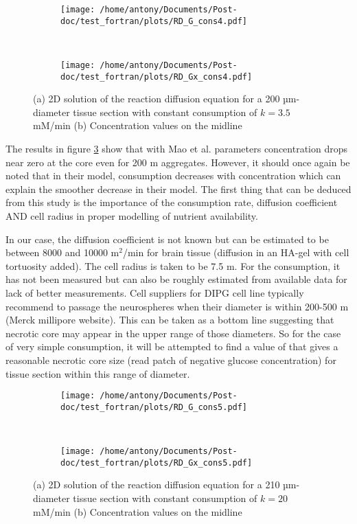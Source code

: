 \documentclass[11pt,a4paper]{article}
\begin{document}
\begin{figure}[ht!]
	\begin{subfigure}{0.45\textwidth}
	\centering
	\texttt{[image: /home/antony/Documents/Post-doc/test\_fortran/plots/RD\_G\_cons4.pdf]}
	\caption{ \label{RD_G_cons4}}
	\end{subfigure}
	~~
	\begin{subfigure}{0.45\textwidth}
	\texttt{[image: /home/antony/Documents/Post-doc/test\_fortran/plots/RD\_Gx\_cons4.pdf]}
		\caption{ \label{RD_Gx_cons4}}
	\end{subfigure}
	\caption{(a) 2D solution of the reaction diffusion equation for a 200 µm-diameter tissue section with constant consumption of $k = 3.5$ mM/min (b) Concentration values on the midline \label{RD_cons4}}
\end{figure}

The results in figure \ref{RD_cons4} show that with Mao et al. parameters concentration drops near zero at the core even for 200 \textmu m aggregates. However, it should once again be noted that in their model, consumption decreases  with concentration which can explain the smoother decrease in their model. The first thing that can be deduced from this study is the importance of the consumption rate, diffusion coefficient AND cell radius in proper modelling of nutrient availability.

In our case, the diffusion coefficient is not known but can be estimated to be between 8000 and 10000 \textmu m$^2$/min for brain tissue (diffusion in an HA-gel with cell tortuosity added).  The cell radius is taken to be 7.5 \textmu m. For the consumption, it has not been measured but can also be roughly estimated from available data for lack of better measurements. Cell suppliers for DIPG cell line typically recommend to passage the neurospheres when their diameter is within 200-500 \textmu m (Merck millipore website). This can be taken as a bottom line suggesting that necrotic core may appear in the upper range of those diameters. So for the case of very simple consumption, it will be attempted to find a value of that gives a reasonable necrotic core size (read patch of negative glucose concentration) for tissue section within this range of diameter.

 \begin{figure}[ht!]
	\begin{subfigure}{0.45\textwidth}
	\centering
	\texttt{[image: /home/antony/Documents/Post-doc/test\_fortran/plots/RD\_G\_cons5.pdf]}
	\caption{ \label{RD_G_cons5}}
	\end{subfigure}
	~~
	\begin{subfigure}{0.45\textwidth}
	\texttt{[image: /home/antony/Documents/Post-doc/test\_fortran/plots/RD\_Gx\_cons5.pdf]}
		\caption{ \label{RD_Gx_cons5}}
	\end{subfigure}
	\caption{(a) 2D solution of the reaction diffusion equation for a 210 µm-diameter tissue section with constant consumption of $k = 20$ mM/min (b) Concentration values on the midline \label{RD_cons5}}
\end{figure}
\end{document}
